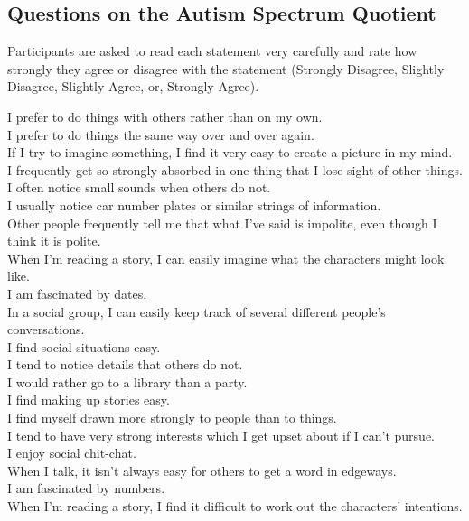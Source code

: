 \documentclass[a4paper, 11pt]{article}
\begin{document}
\newpage
\subsection{Questions on the Autism Spectrum Quotient \cite{Baron Cohen et al}} \label{AQ}

Participants are asked to read each statement very carefully and rate how strongly they agree or disagree with the statement (Strongly Disagree, Slightly Disagree, Slightly Agree, or, Strongly Agree).  \\
\hspace{1cm}

I prefer to do things with others rather than on my own.\\
I prefer to do things the same way over and over again.\\
If I try to imagine something, I find it very easy to create a picture in my mind.\\
I frequently get so strongly absorbed in one thing that I lose sight of other things.\\
I often notice small sounds when others do not.\\
I usually notice car number plates or similar strings of information.\\
Other people frequently tell me that what I’ve said is impolite, even though I think it is polite.\\
When I’m reading a story, I can easily imagine what the characters might look like.\\
I am fascinated by dates.\\
In a social group, I can easily keep track of several different people’s conversations.\\
I find social situations easy.\\
I tend to notice details that others do not.\\
I would rather go to a library than a party.\\
I find making up stories easy.\\
I find myself drawn more strongly to people than to things.\\
I tend to have very strong interests which I get upset about if I can’t pursue.\\
I enjoy social chit-chat.\\
When I talk, it isn’t always easy for others to get a word in edgeways.\\
I am fascinated by numbers.\\
When I’m reading a story, I find it difficult to work out the characters’ intentions.\\
\end{document}
